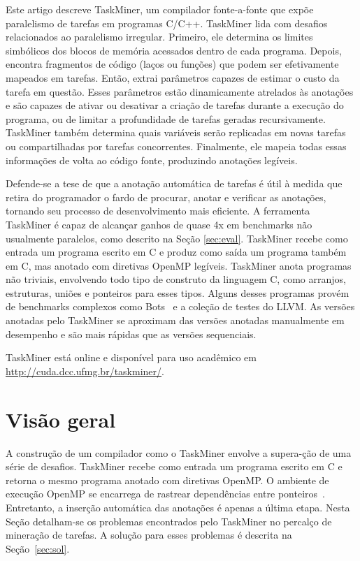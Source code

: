 \documentclass[sigconf]{acmart}
\newcommand\Taskminer{\mbox{\textsf{TaskMiner}}}
\begin{document}
Este artigo descreve {\Taskminer}, um compilador fonte-a-fonte que expõe
paralelismo de tarefas em programas C/C++. {\Taskminer} lida com desafios 
relacionados ao paralelismo irregular. Primeiro, ele determina os limites
simbólicos dos blocos de memória acessados dentro de cada programa. Depois, encontra 
fragmentos de código (laços ou funções) que podem 
ser efetivamente mapeados em tarefas. Então, extrai parâmetros capazes
de estimar o custo da tarefa em questão. Esses parâmetros estão dinamicamente atrelados
às anotações e são capazes de ativar ou desativar a criação de tarefas durante a execução do programa,
ou de limitar a profundidade de tarefas geradas recursivamente. \Taskminer{} também determina
quais variáveis serão replicadas em novas tarefas ou compartilhadas por tarefas concorrentes.
Finalmente, ele mapeia todas essas informações de volta ao código fonte, produzindo
anotações legíveis.

Defende-se a tese de que a anotação automática de tarefas é útil à medida que
retira do programador o fardo de procurar, anotar e verificar as anotações, tornando seu
processo de desenvolvimento mais eficiente. A ferramenta {\Taskminer} é capaz
de alcançar ganhos de quase 4x em benchmarks não usualmente paralelos, como descrito na Seção \ref{sec:eval}. {\Taskminer}
recebe como entrada um programa escrito em C e produz como saída um programa também em C,
mas anotado com diretivas OpenMP legíveis. {\Taskminer} anota programas não triviais, envolvendo
todo tipo de construto da linguagem C, como arranjos, estruturas, uniões e ponteiros para esses tipos.
Alguns desses programas provém de benchmarks complexos como Bots~\cite{Duran09}  e a coleção de testes do LLVM.
As versões anotadas pelo {\Taskminer} se aproximam das versões anotadas manualmente em
desempenho e são mais rápidas que as versões sequenciais.

\Taskminer{} está online e disponível para uso acadêmico em \url{http://cuda.dcc.ufmg.br/taskminer/}.


\section{Visão geral}
\label{sec:ovf}

A construção de um compilador como o \Taskminer{} envolve a supera-ção de uma série  de desafios.
\Taskminer{} recebe como entrada um programa escrito em C e retorna o mesmo programa anotado com 
diretivas OpenMP. O ambiente de execução OpenMP se encarrega de 
rastrear dependências entre ponteiros~\cite{LaGrone11}. Entretanto, a inserção
automática das anotações é apenas a última etapa. Nesta Seção detalham-se os problemas
encontrados pelo \Taskminer{} no percalço de mineração de tarefas. A solução para esses problemas é descrita na Seção~\ref{sec:sol}.
\end{document}
